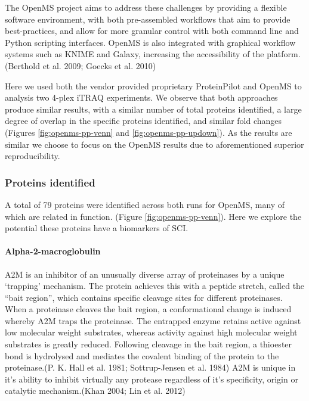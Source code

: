 \documentclass[9pt,lineno]{elife}
\begin{document}
The OpenMS project aims to address these challenges by providing a flexible software environment, with both pre-assembled workflows that aim to provide best-practices, and allow for more granular control with both command line and Python scripting interfaces.
OpenMS is also integrated with graphical workflow systems such as KNIME and Galaxy, increasing the accessibility of the platform.(Berthold et al. 2009; Goecks et al. 2010)

Here we used both the vendor provided proprietary ProteinPilot and OpenMS to analysis two 4-plex iTRAQ experiments.
We observe that both approaches produce similar results, with a similar number of total proteins identified, a large degree of overlap in the specific proteins identified, and similar fold changes (Figures \ref{fig:openms-pp-venn} and \ref{fig:openms-pp-updown}).
As the results are similar we choose to focus on the OpenMS results due to aforementioned superior reproducibility.

\hypertarget{proteins-identified}{%
\subsubsection{Proteins identified}\label{proteins-identified}}

A total of 79 proteins were identified across both runs for OpenMS, many of which are related in function. (Figure \ref{fig:openms-pp-venn}).
Here we explore the potential these proteins have a biomarkers of SCI.

\hypertarget{alpha-2-macroglobulin}{%
\paragraph{Alpha-2-macroglobulin}\label{alpha-2-macroglobulin}}

A2M is an inhibitor of an unusually diverse array of proteinases by a unique `trapping' mechanism.
The protein achieves this with a peptide stretch, called the ``bait region'', which contains specific cleavage sites for different proteinases.
When a proteinase cleaves the bait region, a conformational change is induced whereby A2M traps the proteinase.
The entrapped enzyme retains active against low molecular weight substrates, whereas activity against high molecular weight substrates is greatly reduced.
Following cleavage in the bait region, a thioester bond is hydrolysed and mediates the covalent binding of the protein to the proteinase.(P. K. Hall et al. 1981; Sottrup-Jensen et al. 1984)
A2M is unique in it's ability to inhibit virtually any protease regardless of it's specificity, origin or catalytic mechanism.(Khan 2004; Lin et al. 2012)
\end{document}
